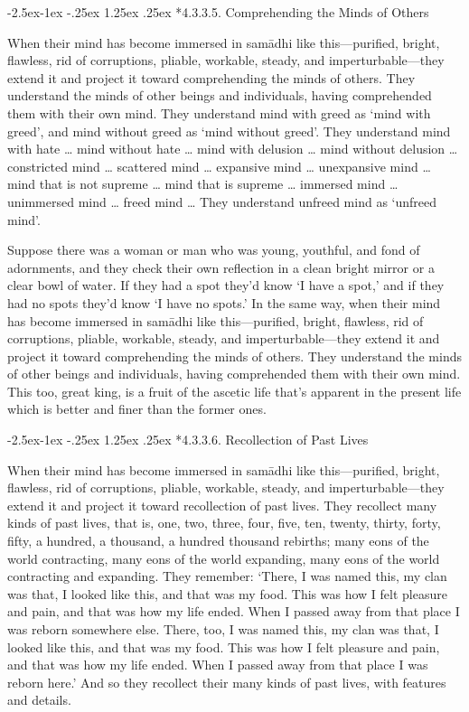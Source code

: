 \documentclass[12pt,openany]{book}%
\makeatletter
\renewcommand\paragraph{\@startsection{paragraph}{4}{\z@}%
            {-2.5ex\@plus -1ex \@minus -.25ex}%
            {1.25ex \@plus .25ex}%
            {\noindent\Semiboldnormalfont\normalsize}}
\makeatother
\begin{document}
\paragraph*{4.3.3.5. Comprehending the Minds of Others }

When their mind has become immersed in \textsanskrit{samādhi} like this—purified, bright, flawless, rid of corruptions, pliable, workable, steady, and imperturbable—they extend it and project it toward comprehending the minds of others. They understand the minds of other beings and individuals, having comprehended them with their own mind. They understand mind with greed as ‘mind with greed’, and mind without greed as ‘mind without greed’. They understand mind with hate … mind without hate … mind with delusion … mind without delusion … constricted mind … scattered mind … expansive mind … unexpansive mind … mind that is not supreme … mind that is supreme … immersed mind … unimmersed mind … freed mind … They understand unfreed mind as ‘unfreed mind’. 

Suppose there was a woman or man who was young, youthful, and fond of adornments, and they check their own reflection in a clean bright mirror or a clear bowl of water. If they had a spot they’d know ‘I have a spot,’ and if they had no spots they’d know ‘I have no spots.’ In the same way, when their mind has become immersed in \textsanskrit{samādhi} like this—purified, bright, flawless, rid of corruptions, pliable, workable, steady, and imperturbable—they extend it and project it toward comprehending the minds of others. They understand the minds of other beings and individuals, having comprehended them with their own mind. This too, great king, is a fruit of the ascetic life that’s apparent in the present life which is better and finer than the former ones. 

\paragraph*{4.3.3.6. Recollection of Past Lives }

When their mind has become immersed in \textsanskrit{samādhi} like this—purified, bright, flawless, rid of corruptions, pliable, workable, steady, and imperturbable—they extend it and project it toward recollection of past lives. They recollect many kinds of past lives, that is, one, two, three, four, five, ten, twenty, thirty, forty, fifty, a hundred, a thousand, a hundred thousand rebirths; many eons of the world contracting, many eons of the world expanding, many eons of the world contracting and expanding. They remember: ‘There, I was named this, my clan was that, I looked like this, and that was my food. This was how I felt pleasure and pain, and that was how my life ended. When I passed away from that place I was reborn somewhere else. There, too, I was named this, my clan was that, I looked like this, and that was my food. This was how I felt pleasure and pain, and that was how my life ended. When I passed away from that place I was reborn here.’ And so they recollect their many kinds of past lives, with features and details. 
\end{document}
